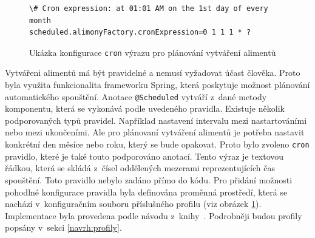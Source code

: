            \begin{figure}
                \begin{verbatim}
\# Cron expression: at 01:01 AM on the 1st day of every month
scheduled.alimonyFactory.cronExpression=0 1 1 1 * ?
                \end{verbatim}
                \caption{Ukázka konfigurace \texttt{cron} výrazu pro plánování vytváření alimentů} 
                \label{code:cron-expression}
            \end{figure}
            Vytvářeni alimentů má být pravidelné a nemusí vyžadovat účast člověka. Proto byla využita funkcionalita frameworku Spring, která poskytuje možnost plánování automatického spouštění.\cite{spring-scheduling} Anotace \verb|@Scheduled| vytváří z~dané metody komponentu, která se vykonává podle uvedeného pravidla. Existuje několik podporovaných typů pravidel. 
            Například nastavení intervalu mezi nastartováními nebo mezi ukončeními. Ale pro plánovaní vytváření alimentů je potřeba nastavit konkrétní den měsíce nebo roku, který se bude opakovat. Proto bylo zvoleno \verb|cron| pravidlo, které je také touto podporováno anotací.\cite{cron-expression} Tento výraz je textovou řádkou, která se skládá z~čísel oddělených mezerami reprezentujících čas spouštění.
            Toto pravidlo nebylo zadáno přímo do kódu. Pro přidání možnosti pohodlné konfigurace pravidla byla definována proměnná prostředí, která se nachází v~konfiguračním souboru příslušného profilu (viz obrázek \ref{code:cron-expression}). Implementace byla provedena podle návodu z~knihy~\cite{sbr:spring-task-scheduling}. Podrobněji budou profily popsány v~sekci \ref{navrh:profily}.
         
